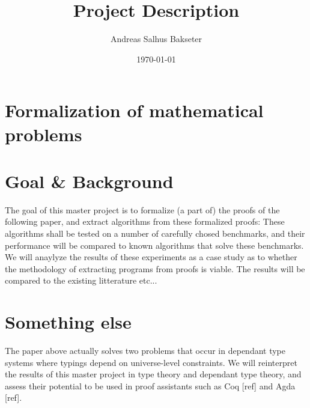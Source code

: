 \documentclass[a4paper,14pt]{article}
\title{Project Description}
\author{Andreas Salhus Bakseter}
\date{\today}
\begin{document}
\maketitle


\section{Formalization of mathematical problems}


\section{  } 




\section*{Goal \& Background}

The goal of this master project is to formalize (a part of) the proofs of the following paper,
and extract algorithms from these formalized proofs: 
These algorithms shall be tested on a number of carefully chosed benchmarks,
and their performance will be compared to known algorithms that solve these benchmarks.
We will anaylyze the results of these experiments as a case study as to whether the methodology of
extracting programs from proofs is viable.
The results will be compared to the existing litterature etc...

\section*{Something else}

The paper above actually solves two problems that occur in dependant type systems where typings depend
on universe-level constraints.
We will reinterpret the results of this master project in type theory and dependant type theory, and assess
their potential to be used in proof assistants such as Coq [ref] and Agda [ref].
\end{document}

